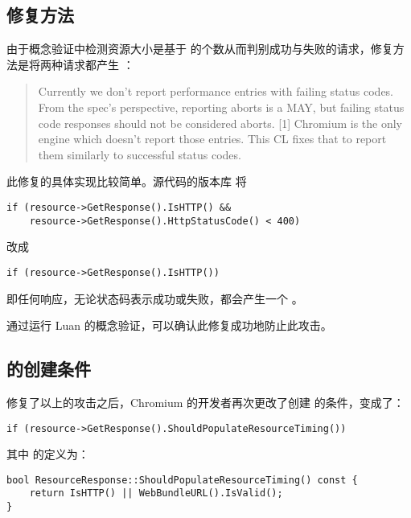 \subsection{修复方法}

由于概念验证中检测资源大小是基于 的个数从而判别成功与失败的请求，修复方法是将两种请求都产生  \cite{fix}：

\begin{quote}
    Currently we don't report performance entries with failing status codes.
    From the spec's perspective, reporting aborts is a MAY, but failing
    status code responses should not be considered aborts. [1]
    Chromium is the only engine which doesn't report those entries.
    This CL fixes that to report them similarly to successful status codes.
\end{quote}

\newpage

此修复的具体实现比较简单。源代码的版本库 \cite{fixcode} 将

\begin{lstlisting}
if (resource->GetResponse().IsHTTP() &&
    resource->GetResponse().HttpStatusCode() < 400)
\end{lstlisting}

改成 

\begin{lstlisting}
if (resource->GetResponse().IsHTTP())
\end{lstlisting}

即任何响应，无论状态码表示成功或失败，都会产生一个 。

通过运行 Luan 的概念验证，可以确认此修复成功地防止此攻击。

\subsection{ 的创建条件}

修复了以上的攻击之后，Chromium 的开发者再次更改了创建  的条件，变成了：

\begin{lstlisting}
if (resource->GetResponse().ShouldPopulateResourceTiming())
\end{lstlisting}

其中  的定义为：

\begin{lstlisting}
bool ResourceResponse::ShouldPopulateResourceTiming() const {
    return IsHTTP() || WebBundleURL().IsValid();
}
\end{lstlisting}
    
